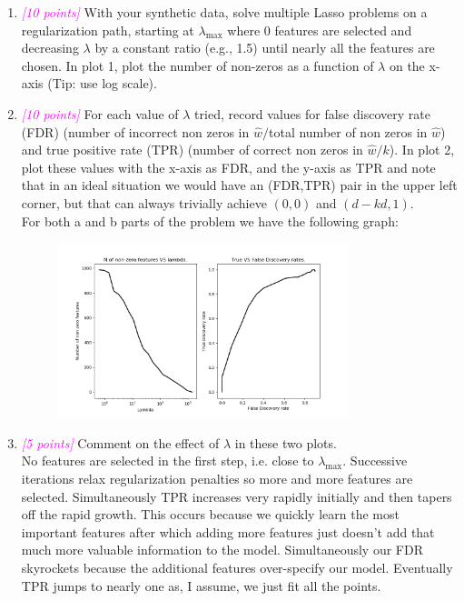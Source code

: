 \documentclass{article}
\newcommand{\1}{\mathbf{1}}
\newcommand{\points}[1]{\small\textcolor{magenta}{\emph{[#1 points]}} \normalsize}
\begin{document}
\begin{enumerate}
    \item \points{10} With your synthetic data, solve multiple Lasso problems on a regularization path, starting at $\lambda_{\max}$ where 0 features are selected and decreasing $\lambda$ by a constant ratio (e.g., 1.5) until nearly all the features are chosen. In plot 1, plot the number of non-zeros as a function of $\lambda$ on the x-axis (Tip: use log scale).
    \item \points{10} For each value of $\lambda$ tried, record values for false discovery rate (FDR) (number of incorrect non zeros in $\widehat w/$total number of non zeros in $\widehat w$) and true positive rate (TPR) (number of correct non zeros in $\widehat w/k$). In plot 2, plot these values with the x-axis as FDR, and the y-axis as TPR and note that in an ideal situation we would have an (FDR,TPR) pair in the upper left corner, but that can always trivially achieve $(0,0)$ and $(d-kd,1)$. \\
    For both a and b parts of the problem we have the following graph:
    \begin{figure}[h!]
        \centering
        \includegraphics[width=0.8\textwidth]{HW2/HW2_plots/CoordinateDescent.png}
    \end{figure}
    
    \newpage
    \item \points{5} Comment on the effect of $\lambda$ in these two plots. \\
    No features are selected in the first step, i.e. close to $\lambda_{\max}$. Successive iterations relax regularization penalties so more and more features are selected. Simultaneously TPR increases very rapidly initially and then tapers off the rapid growth. This occurs because we quickly learn the most important features after which adding more features just doesn't add that much more valuable information to the model. Simultaneously our FDR skyrockets because the additional features over-specify our model. Eventually TPR jumps to nearly one as, I assume, we just fit all the points. \\


\end{enumerate}
\end{document}
